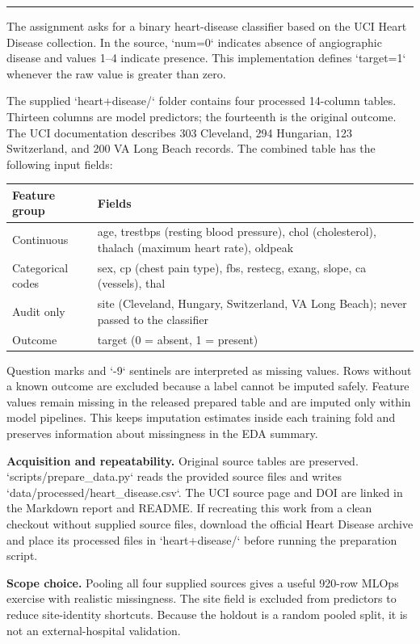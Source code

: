 \documentclass[10pt]{article}
\newcommand{\sectiontitle}[1]{\vspace*{0.15in}{\Large\bfseries\color{navy}#1}\par\vspace{0.08in}\hrule\vspace{0.16in}}
\newcommand{\callout}[1]{\noindent\colorbox{light}{\parbox{\dimexpr\linewidth-2\fboxsep}{#1}}}
\begin{document}
\newpage
\sectiontitle{1. Problem, source, and data contract}
The assignment asks for a binary heart-disease classifier based on the UCI Heart Disease collection. In the source, `num=0` indicates absence of angiographic disease and values 1--4 indicate presence. This implementation defines `target=1` whenever the raw value is greater than zero.

The supplied `heart+disease/` folder contains four processed 14-column tables. Thirteen columns are model predictors; the fourteenth is the original outcome. The UCI documentation describes 303 Cleveland, 294 Hungarian, 123 Switzerland, and 200 VA Long Beach records. The combined table has the following input fields:

\begin{tabularx}{\linewidth}{@{}lX@{}}
\toprule
Feature group & Fields \\
\midrule
Continuous & age, trestbps (resting blood pressure), chol (cholesterol), thalach (maximum heart rate), oldpeak \\
Categorical codes & sex, cp (chest pain type), fbs, restecg, exang, slope, ca (vessels), thal \\
Audit only & site (Cleveland, Hungary, Switzerland, VA Long Beach); never passed to the classifier \\
Outcome & target (0 = absent, 1 = present) \\
\bottomrule
\end{tabularx}

Question marks and `-9` sentinels are interpreted as missing values. Rows without a known outcome are excluded because a label cannot be imputed safely. Feature values remain missing in the released prepared table and are imputed only within model pipelines. This keeps imputation estimates inside each training fold and preserves information about missingness in the EDA summary.

\vspace{0.12in}
\textbf{Acquisition and repeatability.} Original source tables are preserved. `scripts/prepare_data.py` reads the provided source files and writes `data/processed/heart_disease.csv`. The UCI source page and DOI are linked in the Markdown report and README. If recreating this work from a clean checkout without supplied source files, download the official Heart Disease archive and place its processed files in `heart+disease/` before running the preparation script.

\callout{\textbf{Scope choice.} Pooling all four supplied sources gives a useful 920-row MLOps exercise with realistic missingness. The site field is excluded from predictors to reduce site-identity shortcuts. Because the holdout is a random pooled split, it is not an external-hospital validation.}
\end{document}
